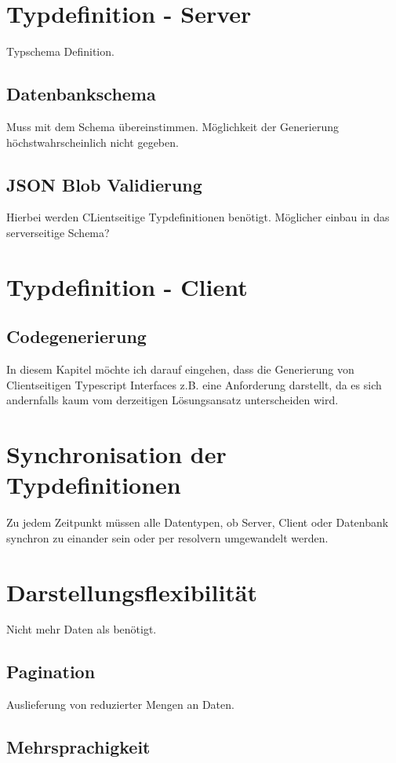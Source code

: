\section{Typdefinition - Server}
Typschema Definition.

\subsection{Datenbankschema}
Muss mit dem Schema übereinstimmen. Möglichkeit der Generierung höchstwahrscheinlich nicht gegeben.
\subsection{JSON Blob Validierung}
Hierbei werden CLientseitige Typdefinitionen benötigt. Möglicher einbau in das serverseitige Schema?

\section{Typdefinition - Client}
\subsection{Codegenerierung}
In diesem Kapitel möchte ich darauf eingehen, dass die Generierung von Clientseitigen Typescript Interfaces z.B. eine Anforderung darstellt, 
da es sich andernfalls kaum vom derzeitigen Lösungsansatz unterscheiden wird. 


\section{Synchronisation der Typdefinitionen}
Zu jedem Zeitpunkt müssen alle Datentypen, ob Server, Client oder Datenbank synchron zu einander sein oder per resolvern umgewandelt werden.

\section{Darstellungsflexibilität}
Nicht mehr Daten als benötigt.
\subsection{Pagination}
Auslieferung von reduzierter Mengen an Daten.
\subsection{Mehrsprachigkeit}

